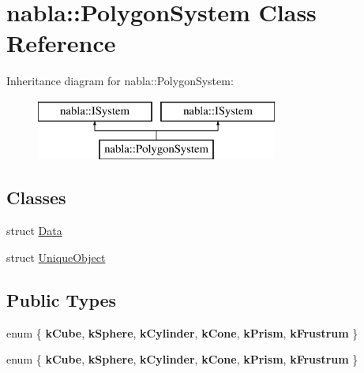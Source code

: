 \hypertarget{classnabla_1_1_polygon_system}{}\section{nabla\+::Polygon\+System Class Reference}
\label{classnabla_1_1_polygon_system}
Inheritance diagram for nabla\+::Polygon\+System\+:\begin{figure}[H]
\begin{center}
\leavevmode
\includegraphics[height=2.000000cm]{classnabla_1_1_polygon_system}
\end{center}
\end{figure}
\subsection*{Classes}
\begin{DoxyCompactItemize}
\item 
struct \mbox{\hyperlink{structnabla_1_1_polygon_system_1_1_data}{Data}}
\item 
struct \mbox{\hyperlink{structnabla_1_1_polygon_system_1_1_unique_object}{Unique\+Object}}
\end{DoxyCompactItemize}
\subsection*{Public Types}
\begin{DoxyCompactItemize}
\item 
\mbox{\label{classnabla_1_1_polygon_system_abcac2c41b859a443494deac064aa9ffd}} 
enum \{ \newline
{\bfseries k\+Cube}, 
{\bfseries k\+Sphere}, 
{\bfseries k\+Cylinder}, 
{\bfseries k\+Cone}, 
\newline
{\bfseries k\+Prism}, 
{\bfseries k\+Frustrum}
 \}
\item 
\mbox{\label{classnabla_1_1_polygon_system_a14deeeeee3dbf702277a70b9a2eb69df}} 
enum \{ \newline
{\bfseries k\+Cube}, 
{\bfseries k\+Sphere}, 
{\bfseries k\+Cylinder}, 
{\bfseries k\+Cone}, 
\newline
{\bfseries k\+Prism}, 
{\bfseries k\+Frustrum}
 \}
\end{DoxyCompactItemize}

